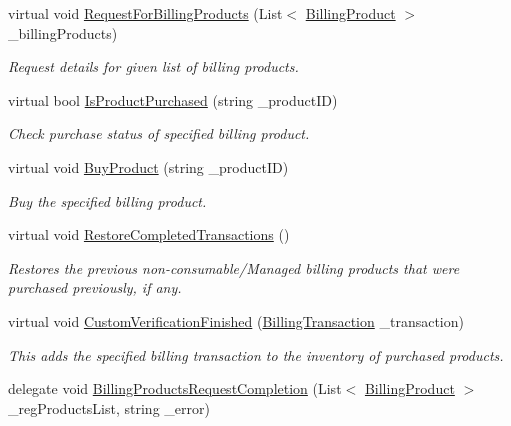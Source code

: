 \begin{DoxyCompactItemize}
\item 
virtual void \hyperlink{class_voxel_busters_1_1_native_plugins_1_1_billing_ab2d39b35e76f33981cbc4e5261290ebc}{Request\+For\+Billing\+Products} (List$<$ \hyperlink{class_voxel_busters_1_1_native_plugins_1_1_billing_product}{Billing\+Product} $>$ \+\_\+billing\+Products)
\begin{DoxyCompactList}\small\item\em Request details for given list of billing products. \end{DoxyCompactList}\item 
virtual bool \hyperlink{class_voxel_busters_1_1_native_plugins_1_1_billing_a9f4b9e824b45e38980b0e6e3cb1faa3d}{Is\+Product\+Purchased} (string \+\_\+product\+I\+D)
\begin{DoxyCompactList}\small\item\em Check purchase status of specified billing product. \end{DoxyCompactList}\item 
virtual void \hyperlink{class_voxel_busters_1_1_native_plugins_1_1_billing_a1232f7b71e94e1d3ccac71b82ffb0097}{Buy\+Product} (string \+\_\+product\+I\+D)
\begin{DoxyCompactList}\small\item\em Buy the specified billing product. \end{DoxyCompactList}\item 
virtual void \hyperlink{class_voxel_busters_1_1_native_plugins_1_1_billing_a2897cb978428d90065b0c9b1fbf36200}{Restore\+Completed\+Transactions} ()
\begin{DoxyCompactList}\small\item\em Restores the previous non-\/consumable/\+Managed billing products that were purchased previously, if any. \end{DoxyCompactList}\item 
virtual void \hyperlink{class_voxel_busters_1_1_native_plugins_1_1_billing_afcce8e38d572018183652ee39623d3bd}{Custom\+Verification\+Finished} (\hyperlink{class_voxel_busters_1_1_native_plugins_1_1_billing_transaction}{Billing\+Transaction} \+\_\+transaction)
\begin{DoxyCompactList}\small\item\em This adds the specified billing transaction to the inventory of purchased products. \end{DoxyCompactList}\item 
delegate void \hyperlink{class_voxel_busters_1_1_native_plugins_1_1_billing_a59d14c1fff02f8bbf1946415f81b77f0}{Billing\+Products\+Request\+Completion} (List$<$ \hyperlink{class_voxel_busters_1_1_native_plugins_1_1_billing_product}{Billing\+Product} $>$ \+\_\+reg\+Products\+List, string \+\_\+error)

\end{DoxyCompactItemize}

